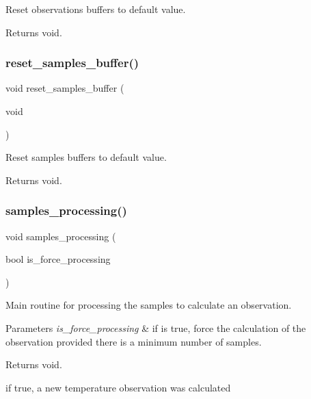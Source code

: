Reset observations buffers to default value. 

\begin{DoxyReturn}{Returns}
void. 
\end{DoxyReturn}
\mbox{\label{i2c-th_8ino_ae176339df7451dc03037f319710575aa}} 
\subsubsection{\texorpdfstring{reset\+\_\+samples\+\_\+buffer()}{reset\_samples\_buffer()}}
{\footnotesize\ttfamily void reset\+\_\+samples\+\_\+buffer (\begin{DoxyParamCaption}\item[{void}]{ }\end{DoxyParamCaption})}



Reset samples buffers to default value. 

\begin{DoxyReturn}{Returns}
void. 
\end{DoxyReturn}
\mbox{\label{i2c-th_8ino_aba0fc91d6c2829df00a9d5fe2b921c90}} 
\subsubsection{\texorpdfstring{samples\+\_\+processing()}{samples\_processing()}}
{\footnotesize\ttfamily void samples\+\_\+processing (\begin{DoxyParamCaption}\item[{bool}]{is\+\_\+force\+\_\+processing }\end{DoxyParamCaption})}



Main routine for processing the samples to calculate an observation. 


\begin{DoxyParams}{Parameters}
{\em is\+\_\+force\+\_\+processing} & if is true, force the calculation of the observation provided there is a minimum number of samples. \\
\hline
\end{DoxyParams}
\begin{DoxyReturn}{Returns}
void. 
\end{DoxyReturn}
if true, a new temperature observation was calculated

